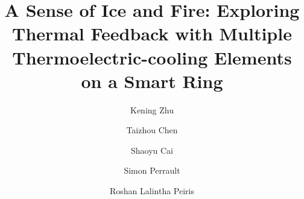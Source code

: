 \documentclass[preprint,12pt]{elsarticle}
\begin{document}
\linenumbers
\begin{frontmatter}



\title{A Sense of Ice and Fire: Exploring Thermal Feedback with Multiple Thermoelectric-cooling Elements on a Smart Ring}


\author[scm1]{Kening Zhu}
\author[scm1]{Taizhou Chen}
\author[scm1]{Shaoyu Cai}
\author[nus2]{Simon Perrault}
\author[kmd]{Roshan Lalintha Peiris}

\address[scm1]{School of Creative Media, City University of Hong Kong, Hong Kong}
\address[nus2]{Yale-NUS College, Singapore}
\address[kmd]{Keio University Graduate School of Media Design, Keio University, Japan}



\end{frontmatter}
\end{document}
